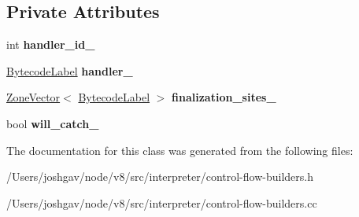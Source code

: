 \subsection*{Private Attributes}
\begin{DoxyCompactItemize}
\item 
int {\bfseries handler\+\_\+id\+\_\+}\hypertarget{classv8_1_1internal_1_1interpreter_1_1_try_finally_builder_ac35b721edfdaf163600dbcc5a43cf1b6}{}\label{classv8_1_1internal_1_1interpreter_1_1_try_finally_builder_ac35b721edfdaf163600dbcc5a43cf1b6}

\item 
\hyperlink{classv8_1_1internal_1_1interpreter_1_1_bytecode_label}{Bytecode\+Label} {\bfseries handler\+\_\+}\hypertarget{classv8_1_1internal_1_1interpreter_1_1_try_finally_builder_abad9ca9b51b1c421353820f52d3e2cf9}{}\label{classv8_1_1internal_1_1interpreter_1_1_try_finally_builder_abad9ca9b51b1c421353820f52d3e2cf9}

\item 
\hyperlink{classv8_1_1internal_1_1_zone_vector}{Zone\+Vector}$<$ \hyperlink{classv8_1_1internal_1_1interpreter_1_1_bytecode_label}{Bytecode\+Label} $>$ {\bfseries finalization\+\_\+sites\+\_\+}\hypertarget{classv8_1_1internal_1_1interpreter_1_1_try_finally_builder_ac9c7830b72d5c616fd9459ea703ae963}{}\label{classv8_1_1internal_1_1interpreter_1_1_try_finally_builder_ac9c7830b72d5c616fd9459ea703ae963}

\item 
bool {\bfseries will\+\_\+catch\+\_\+}\hypertarget{classv8_1_1internal_1_1interpreter_1_1_try_finally_builder_a05220514b9a12e983e5beafd97a9a5b0}{}\label{classv8_1_1internal_1_1interpreter_1_1_try_finally_builder_a05220514b9a12e983e5beafd97a9a5b0}

\end{DoxyCompactItemize}


The documentation for this class was generated from the following files\+:\begin{DoxyCompactItemize}
\item 
/\+Users/joshgav/node/v8/src/interpreter/control-\/flow-\/builders.\+h\item 
/\+Users/joshgav/node/v8/src/interpreter/control-\/flow-\/builders.\+cc\end{DoxyCompactItemize}
